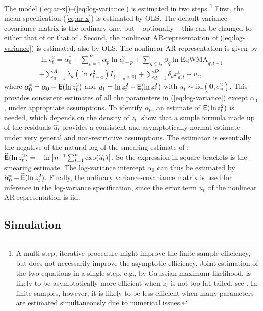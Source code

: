 \documentclass[article,nojss]{jss}
\begin{document}
The model (\ref{eq:ar-x})--(\ref{eq:log-variance}) is estimated in two
steps.\footnote{A multi-step, iterative procedure might improve the
  finite sample efficiency, but does not necessarily improve the
  asymptotic efficiency. Joint estimation of the two equations in a
  single step, e.g., by Gaussian maximum likelihood, is likely to be
  asymptotically more efficient when $z_t$ is not too fat-tailed, see
  \citet{FrancqSucarrat2013}. In finite samples, however, it is likely
  to be less efficient when many parameters are estimated
  simultaneously due to numerical issues.} First, the mean
specification (\ref{eq:ar-x}) is estimated by OLS. The default
variance-covariance matrix is the ordinary one, but -- optionally --
this can be changed to either that of \cite{White80} or that of
\cite{Neweyetal87}. Second, the nonlinear AR-representation of
(\ref{eq:log-variance}) is estimated, also by OLS. The nonlinear
AR-representation is given by
%
\begin{multline}
  \ln\epsilon_t^2 = \alpha_0^* + \sum_{p=1}^P \alpha_p \ln\epsilon_{t-p}^2 + \sum_{q\in Q} \beta_q \ln \text{EqWMA}_{q,t-1}\\
  + \sum_{a=1}^A \lambda_a(\ln\epsilon_{t-a}^2)I_{\{\epsilon_{t-a} < 0\}} + \sum_{d=1}^D\delta_d x_{d,t}^v + u_t,
\end{multline}
%
where $\alpha_0^* = \alpha_0 + \mathsf{E}(\ln z_t^2)$ and
$u_t=\ln z_t^2 - \mathsf{E}(\ln z_t^2)$ with $u_t \sim \text{iid}(0,
\sigma_u^2)$. This provides consistent estimates of all the parameters
in (\ref{eq:log-variance}) except $\alpha_0$, under appropriate
assumptions. To identify $\alpha_0$, an estimate of $\mathsf{E}(\ln z_t^2)$ is
needed, which depends on the density of
$z_t$. \cite{SucarratGronnebergEscribano2016} show that a simple
formula made up of the residuals $\widehat{u}_t$ provides a consistent
and asymptotically normal estimate under very general and
non-restrictive assumptions. The estimator is essentially the negative
of the natural log of the smearing estimate of \cite{Duan1983}:
$\widehat{\mathsf{E}}(\ln z_t^2) = -\ln \left[ n^{-1} \sum_{t=1}^n
  \exp(\widehat{u}_t) \right]$. So the expression in square brackets
is the smearing estimate. The log-variance intercept $\alpha_0$ can
thus be estimated by $\widehat{\alpha}_0^* - \widehat{\mathsf{E}}(\ln
z_t^2)$. Finally, the ordinary variance-covariance matrix is used for
inference in the log-variance specification, since the error term
$u_t$ of the nonlinear AR-representation is iid.

\subsection{Simulation}
\label{subsec:simulation}
\end{document}
